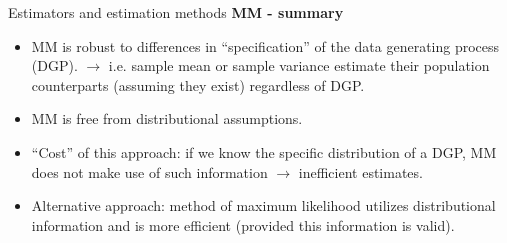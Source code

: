 \documentclass{beamer}
\begin{document}
\begin{frame}{Estimators and estimation methods}
\textbf{MM - summary}\\
\begin{itemize}
\item MM is robust to differences in ``specification'' of the data generating process (DGP). $\rightarrow$ i.e. sample mean or sample variance estimate their population counterparts (assuming they exist) regardless of DGP.
\medskip
\item MM is free from distributional assumptions.
\medskip
\item ``Cost'' of this approach: if we know the specific distribution of a DGP, MM does not make use of such information $\rightarrow$ inefficient estimates.
\medskip 
\item Alternative approach: method of maximum likelihood utilizes distributional information and is more efficient (provided this information is valid).
\end{itemize}
\end{frame}
\end{document}
